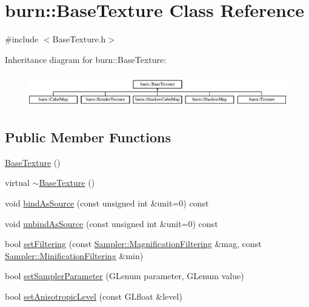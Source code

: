 \hypertarget{classburn_1_1_base_texture}{\section{burn\-:\-:Base\-Texture Class Reference}
\label{classburn_1_1_base_texture}
}


{\ttfamily \#include $<$Base\-Texture.\-h$>$}

Inheritance diagram for burn\-:\-:Base\-Texture\-:\begin{figure}[H]
\begin{center}
\leavevmode
\includegraphics[height=1.473684cm]{classburn_1_1_base_texture}
\end{center}
\end{figure}
\subsection*{Public Member Functions}
\begin{DoxyCompactItemize}
\item 
\hyperlink{classburn_1_1_base_texture_a7aaaf6a1bd92d7efbf924255f10d31ad}{Base\-Texture} ()
\item 
virtual \hyperlink{classburn_1_1_base_texture_a054138cc6815ce69a61d9a3562f40a97}{$\sim$\-Base\-Texture} ()
\item 
void \hyperlink{classburn_1_1_base_texture_a4e586c45bf9b0936c17b2fa86aafad9b}{bind\-As\-Source} (const unsigned int \&unit=0) const 
\item 
void \hyperlink{classburn_1_1_base_texture_a88f83680c883f5962394061104a6c1c0}{unbind\-As\-Source} (const unsigned int \&unit=0) const 
\item 
bool \hyperlink{classburn_1_1_base_texture_afacc4aec15130a7b9b938bb7e8af1b07}{set\-Filtering} (const \hyperlink{classburn_1_1_sampler_a09433eae16f8623591d415a3f8c6afec}{Sampler\-::\-Magnification\-Filtering} \&mag, const \hyperlink{classburn_1_1_sampler_a09d6e36f45577a56ce230549aeaaab10}{Sampler\-::\-Minification\-Filtering} \&min)
\item 
bool \hyperlink{classburn_1_1_base_texture_acc07ff83e953a842ed65576ccc8a30e5}{set\-Sampler\-Parameter} (G\-Lenum parameter, G\-Lenum value)
\item 
bool \hyperlink{classburn_1_1_base_texture_a7b1590c284aa57ce7776eb294abd75ae}{set\-Anisotropic\-Level} (const G\-Lfloat \&level)
\end{DoxyCompactItemize}
